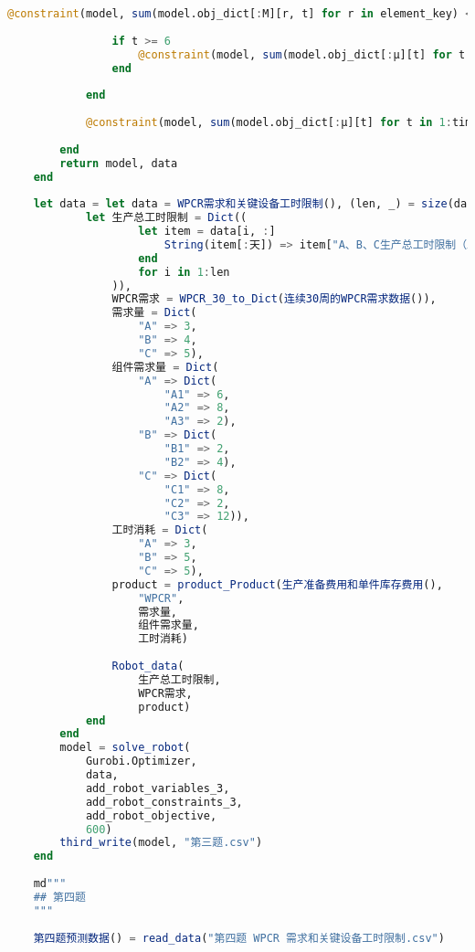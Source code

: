 \begin{appendices}
\begin{lstlisting}[language=julia]
                @constraint(model, sum(model.obj_dict[:M][r, t] for r in element_key) <= data.:生产总工时限制[int2week(t)])
    
                if t >= 6
                    @constraint(model, sum(model.obj_dict[:μ][t] for t in t-5:t) <= 1)
                end
    
            end
    
            @constraint(model, sum(model.obj_dict[:μ][t] for t in 1:time) == 7)
    
        end
        return model, data
    end
    
    let data = let data = WPCR需求和关键设备工时限制(), (len, _) = size(data)
            let 生产总工时限制 = Dict((
                    let item = data[i, :]
                        String(item[:天]) => item["A、B、C生产总工时限制（工时）"]
                    end
                    for i in 1:len
                )),
                WPCR需求 = WPCR_30_to_Dict(连续30周的WPCR需求数据()),
                需求量 = Dict(
                    "A" => 3,
                    "B" => 4,
                    "C" => 5),
                组件需求量 = Dict(
                    "A" => Dict(
                        "A1" => 6,
                        "A2" => 8,
                        "A3" => 2),
                    "B" => Dict(
                        "B1" => 2,
                        "B2" => 4),
                    "C" => Dict(
                        "C1" => 8,
                        "C2" => 2,
                        "C3" => 12)),
                工时消耗 = Dict(
                    "A" => 3,
                    "B" => 5,
                    "C" => 5),
                product = product_Product(生产准备费用和单件库存费用(),
                    "WPCR",
                    需求量,
                    组件需求量,
                    工时消耗)
    
                Robot_data(
                    生产总工时限制,
                    WPCR需求,
                    product)
            end
        end
        model = solve_robot(
            Gurobi.Optimizer,
            data,
            add_robot_variables_3,
            add_robot_constraints_3,
            add_robot_objective,
            600)
        third_write(model, "第三题.csv")
    end
    
    md"""
    ## 第四题
    """
    
    第四题预测数据() = read_data("第四题 WPCR 需求和关键设备工时限制.csv")
    

\end{lstlisting}
\end{appendices}
